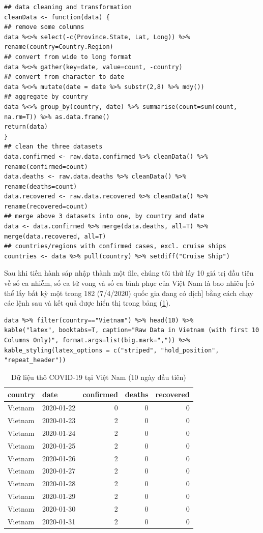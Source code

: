 \documentclass[12pt, a4paper,oneside]{book}
\theoremstyle{definition}
\begin{document}
\begin{lstlisting}
## data cleaning and transformation
cleanData <- function(data) {
## remove some columns
data %<>% select(-c(Province.State, Lat, Long)) %>% rename(country=Country.Region)
## convert from wide to long format
data %<>% gather(key=date, value=count, -country)
## convert from character to date
data %<>% mutate(date = date %>% substr(2,8) %>% mdy())
## aggregate by country
data %<>% group_by(country, date) %>% summarise(count=sum(count, na.rm=T)) %>% as.data.frame()
return(data)
}
## clean the three datasets
data.confirmed <- raw.data.confirmed %>% cleanData() %>% rename(confirmed=count)
data.deaths <- raw.data.deaths %>% cleanData() %>% rename(deaths=count)
data.recovered <- raw.data.recovered %>% cleanData() %>% rename(recovered=count)
## merge above 3 datasets into one, by country and date
data <- data.confirmed %>% merge(data.deaths, all=T) %>% merge(data.recovered, all=T)
## countries/regions with confirmed cases, excl. cruise ships
countries <- data %>% pull(country) %>% setdiff("Cruise Ship")
\end{lstlisting}
Sau khi tiến hành sáp nhập thành một file, chúng tôi thử lấy 10 giá trị đầu tiên về số ca nhiễm, số ca tử vong và số ca bình phục của Việt Nam là bao nhiêu [có thể lấy bất kỳ một trong 182 (7/4/2020) quốc gia đang có dịch] bằng cách chạy các lệnh sau và kết quả được hiển thị trong bảng (\ref{b24}).
\begin{lstlisting}
data %>% filter(country=="Vietnam") %>% head(10) %>%
kable("latex", booktabs=T, caption="Raw Data in Vietnam (with first 10 Columns Only)", format.args=list(big.mark=",")) %>%
kable_styling(latex_options = c("striped", "hold_position", "repeat_header"))
\end{lstlisting}
\begin{table}[!h]	
	\caption{Dữ liệu thô COVID-19 tại Việt Nam (10 ngày đầu tiên)}
	\label{b24}
	\centering
	\begin{tabular}{llrrr}
		\toprule
		country & date & confirmed & deaths & recovered\\
		\midrule
		\rowcolor{gray!6}  Vietnam & 2020-01-22 & 0 & 0 & 0\\
		Vietnam & 2020-01-23 & 2 & 0 & 0\\
		\rowcolor{gray!6}  Vietnam & 2020-01-24 & 2 & 0 & 0\\
		Vietnam & 2020-01-25 & 2 & 0 & 0\\
		\rowcolor{gray!6}  Vietnam & 2020-01-26 & 2 & 0 & 0\\
		\addlinespace
		Vietnam & 2020-01-27 & 2 & 0 & 0\\
		\rowcolor{gray!6}  Vietnam & 2020-01-28 & 2 & 0 & 0\\
		Vietnam & 2020-01-29 & 2 & 0 & 0\\
		\rowcolor{gray!6}  Vietnam & 2020-01-30 & 2 & 0 & 0\\
		Vietnam & 2020-01-31 & 2 & 0 & 0\\
		\bottomrule
	\end{tabular}
\end{table}
\end{document}
